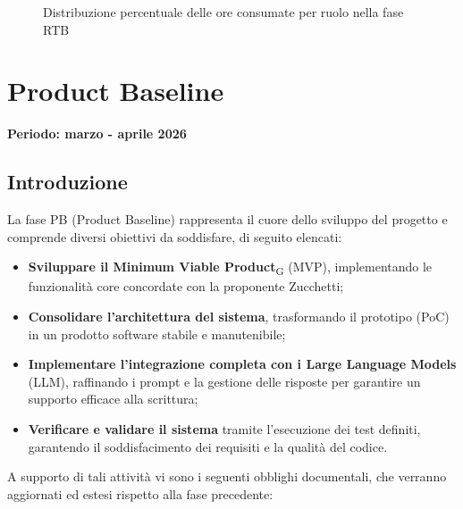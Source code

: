 \documentclass[11pt,a4paper]{article}
\begin{document}
\begin{figure}[H]
    \centering
    \caption{Distribuzione percentuale delle ore consumate per ruolo nella fase RTB}
    \label{fig:torta_ruoli_rtb}
\end{figure}


\newpage
\section{Product Baseline}
\small\textbf{Periodo: marzo - aprile 2026}
\subsection{Introduzione}
La fase PB (Product Baseline) rappresenta il cuore dello sviluppo del progetto e comprende diversi obiettivi da soddisfare, di seguito elencati:
\begin{itemize}
    \item \textbf{Sviluppare il Minimum Viable Product}\textsubscript{G} (MVP), implementando le funzionalità core concordate con la proponente Zucchetti;
    \item \textbf{Consolidare l'architettura del sistema}, trasformando il prototipo (PoC) in un prodotto software stabile e manutenibile;
    \item \textbf{Implementare l'integrazione completa con i Large Language Models} (LLM), raffinando i prompt e la gestione delle risposte per garantire un supporto efficace alla scrittura;
    \item \textbf{Verificare e validare il sistema} tramite l'esecuzione dei test definiti, garantendo il soddisfacimento dei requisiti e la qualità del codice.
\end{itemize}

\noindent A supporto di tali attività vi sono i seguenti obblighi documentali, che verranno aggiornati ed estesi rispetto alla fase precedente:
\end{document}
